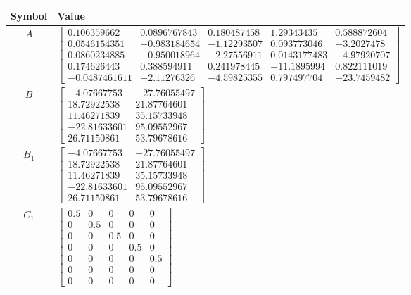 \begin{tabular}{cl}
\hline
  Symbol  & Value                                                                                                                                                                                                                                                                                                                                                                                                  \\
\hline
   $A$    & $\left[\begin{matrix}0.106359662 & 0.0896767843 & 0.180487458 & 1.29343435 & 0.588872604\\0.0546154351 & -0.983184654 & -1.12293507 & 0.093773046 & -3.2027478\\0.0860234885 & -0.950018964 & -2.27556911 & 0.0143177483 & -4.97920707\\0.174626443 & 0.388594911 & 0.241978445 & -11.1895994 & 0.822111019\\-0.0487461611 & -2.11276326 & -4.59825355 & 0.797497704 & -23.7459482\end{matrix}\right]$ \\
   $B$    & $\left[\begin{matrix}-4.07667753 & -27.76055497\\18.72922538 & 21.87764601\\11.46271839 & 35.15733948\\-22.81633601 & 95.09552967\\26.71150861 & 53.79678616\end{matrix}\right]$                                                                                                                                                                                                                       \\
 $B_{1}$  & $\left[\begin{matrix}-4.07667753 & -27.76055497\\18.72922538 & 21.87764601\\11.46271839 & 35.15733948\\-22.81633601 & 95.09552967\\26.71150861 & 53.79678616\end{matrix}\right]$                                                                                                                                                                                                                       \\
 $C_{1}$  & $\left[\begin{matrix}0.5 & 0 & 0 & 0 & 0\\0 & 0.5 & 0 & 0 & 0\\0 & 0 & 0.5 & 0 & 0\\0 & 0 & 0 & 0.5 & 0\\0 & 0 & 0 & 0 & 0.5\\0 & 0 & 0 & 0 & 0\\0 & 0 & 0 & 0 & 0\end{matrix}\right]$                                                                                                                                                                                                                 \\

\end{tabular}
